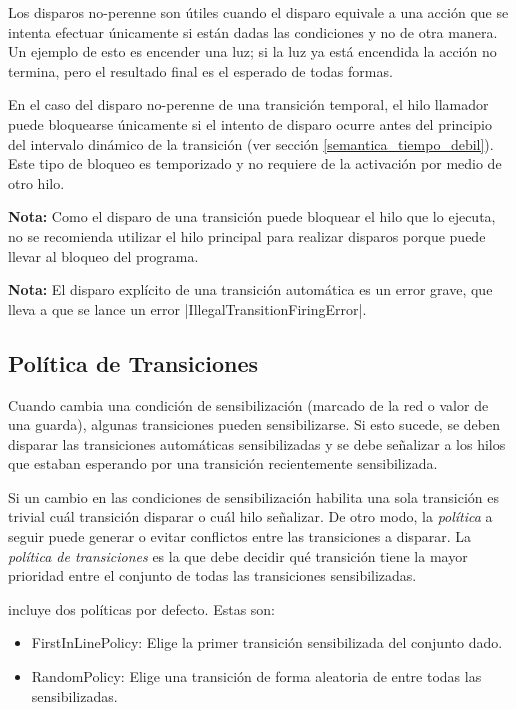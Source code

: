 Los disparos no-perenne son útiles cuando el disparo equivale a una acción que
se intenta efectuar únicamente si están dadas las condiciones y no de otra
manera. Un ejemplo de esto es encender una luz; si la luz ya está encendida la
acción no termina, pero el resultado final es el esperado de todas formas.

En el caso del disparo no-perenne de una transición temporal, el hilo
llamador puede bloquearse únicamente si el intento de disparo ocurre antes del
principio del intervalo dinámico de la transición (ver sección
\ref{semantica_tiempo_debil}). Este tipo de bloqueo es temporizado y no requiere
de la activación por medio de otro hilo.

\begin{framed}
\textbf{Nota:} Como el disparo de una transición puede bloquear el hilo que lo
ejecuta, no se recomienda utilizar el hilo principal para realizar disparos
porque puede llevar al bloqueo del programa.
\end{framed}

\begin{framed}
\textbf{Nota:} El disparo explícito de una transición automática es un error
grave, que lleva a que se lance un error
|IllegalTransitionFiringError|.
\end{framed}

\subsection{Política de Transiciones}

Cuando cambia una condición de sensibilización (marcado de la red o valor de
una guarda), algunas transiciones pueden sensibilizarse. Si esto sucede, se
deben disparar las transiciones automáticas sensibilizadas y se debe señalizar a
los hilos que estaban esperando por una transición recientemente sensibilizada.

Si un cambio en las condiciones de sensibilización habilita una sola
transición es trivial cuál transición disparar o cuál hilo señalizar. De otro
modo, la \textit{política} a seguir puede generar o evitar conflictos entre las
transiciones a disparar.
La \textit{política de transiciones} es la que debe decidir qué transición tiene
la mayor prioridad entre el conjunto de todas las transiciones sensibilizadas.

\javapetriconcurrencymonitor incluye dos políticas por defecto. Estas son:
\begin{itemize}
    \item FirstInLinePolicy: Elige la primer transición sensibilizada del
    conjunto dado.
    \item RandomPolicy: Elige una transición de forma aleatoria de entre todas
    las sensibilizadas.
\end{itemize}

